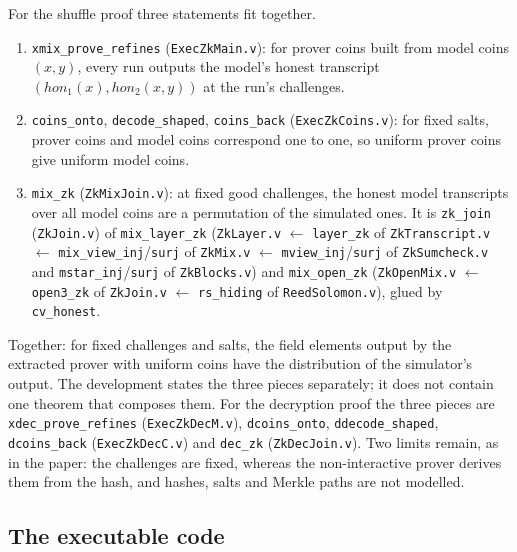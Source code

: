 \documentclass[11pt,a4paper]{article}
\theoremstyle{definition}
\theoremstyle{plain}
\begin{document}
For the shuffle proof three statements fit together.
\begin{enumerate}[leftmargin=1.6em,itemsep=2pt]
\item \texttt{xmix\_prove\_refines} (\texttt{ExecZkMain.v}): for prover coins built from model coins
  $(x,y)$, every run outputs the model's honest transcript $(\mathit{hon}_1(x),\mathit{hon}_2(x,y))$
  at the run's challenges.
\item \texttt{coins\_onto}, \texttt{decode\_shaped}, \texttt{coins\_back} (\texttt{ExecZkCoins.v}): for fixed
  salts, prover coins and model coins correspond one to one, so uniform prover coins give uniform
  model coins.
\item \texttt{mix\_zk} (\texttt{ZkMixJoin.v}): at fixed good challenges, the honest model transcripts
  over all model coins are a permutation of the simulated ones. It is \texttt{zk\_join}
  (\texttt{ZkJoin.v}) of \texttt{mix\_layer\_zk} (\texttt{ZkLayer.v} $\leftarrow$ \texttt{layer\_zk} of
  \texttt{ZkTranscript.v} $\leftarrow$ \texttt{mix\_view\_inj}/\texttt{surj} of \texttt{ZkMix.v} $\leftarrow$
  \texttt{mview\_inj}/\texttt{surj} of \texttt{ZkSumcheck.v} and \texttt{mstar\_inj}/\texttt{surj} of
  \texttt{ZkBlocks.v}) and \texttt{mix\_open\_zk} (\texttt{ZkOpenMix.v} $\leftarrow$ \texttt{open3\_zk} of
  \texttt{ZkJoin.v} $\leftarrow$ \texttt{rs\_hiding} of \texttt{ReedSolomon.v}), glued by \texttt{cv\_honest}.
\end{enumerate}
Together: for fixed challenges and salts, the field elements output by the extracted prover with
uniform coins have the distribution of the simulator's output. The development states the three
pieces separately; it does not contain one theorem that composes them. For the decryption proof
the three pieces are \texttt{xdec\_prove\_refines} (\texttt{ExecZkDecM.v}), \texttt{dcoins\_onto},
\texttt{ddecode\_shaped}, \texttt{dcoins\_back} (\texttt{ExecZkDecC.v}) and \texttt{dec\_zk}
(\texttt{ZkDecJoin.v}). Two limits remain, as in the paper: the challenges are fixed, whereas the
non-interactive prover derives them from the hash, and hashes, salts and Merkle paths are not
modelled.

\subsection{The executable code}
\end{document}
